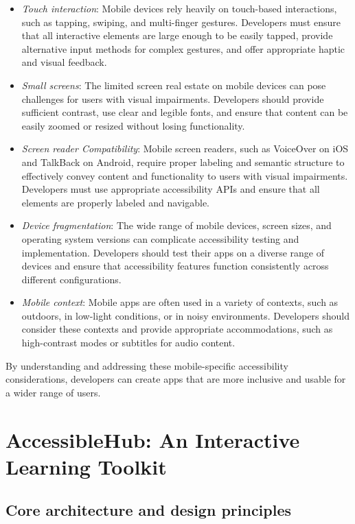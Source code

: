 \begin{itemize}
    \item \textit{Touch interaction}: Mobile devices rely heavily on touch-based interactions, such as tapping, swiping, and multi-finger gestures. Developers must ensure that all interactive elements are large enough to be easily tapped, provide alternative input methods for complex gestures, and offer appropriate haptic and visual feedback.
    \item \textit{Small screens}: The limited screen real estate on mobile devices can pose challenges for users with visual impairments. Developers should provide sufficient contrast, use clear and legible fonts, and ensure that content can be easily zoomed or resized without losing functionality.
    \item \textit{Screen reader Compatibility}: Mobile screen readers, such as VoiceOver on iOS and TalkBack on Android, require proper labeling and semantic structure to effectively convey content and functionality to users with visual impairments. Developers must use appropriate accessibility APIs and ensure that all elements are properly labeled and navigable.
    \item \textit{Device fragmentation}: The wide range of mobile devices, screen sizes, and operating system versions can complicate accessibility testing and implementation. Developers should test their apps on a diverse range of devices and ensure that accessibility features function consistently across different configurations.
    \item \textit{Mobile context}: Mobile apps are often used in a variety of contexts, such as outdoors, in low-light conditions, or in noisy environments. Developers should consider these contexts and provide appropriate accommodations, such as high-contrast modes or subtitles for audio content.
\end{itemize}

By understanding and addressing these mobile-specific accessibility considerations, developers can create apps that are more inclusive and usable for a wider range of users.

\section{AccessibleHub: An Interactive Learning Toolkit}
\label{sec:accessiblehub}

\subsection{Core architecture and design principles}

